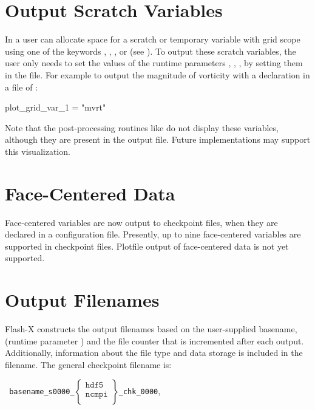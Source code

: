 \section{Output Scratch Variables}
\label{lbl:OutputScratchVariables}
In \flashx a user can allocate space for a scratch or temporary
variable with grid scope using one of the
 keywords , ,
, or
 (see ). 
To output these scratch variables, the user
only needs to set the values of the runtime parameters
,
, \etc, by
setting them in the  file.
For example to output the magnitude of vorticity
with a declaration in a  file of :
\begin{codeseg}
plot_grid_var_1 = "mvrt"
\end{codeseg}
Note that the post-processing routines like  do not display these variables,
although they are present in the output file.  Future implementations may support this visualization.

\section{Face-Centered Data}
Face-centered variables are now output to checkpoint files, when they are declared in a configuration file.  Presently, up to nine face-centered variables are supported in checkpoint files.  Plotfile output of face-centered data is not yet supported.

\section{Output Filenames}
\label{Sec:Output file names}


Flash-X constructs the output filenames%
based on the user-supplied basename, (runtime parameter )
and the file counter that is incremented after each output.
Additionally, information about the file type and data storage is
included in the filename.  The general checkpoint filename is:
\medskip

\texttt{
basename\_s0000\_$\left\{\begin{array}{c}\mathtt{hdf5}\\ \mathtt{ncmpi}\\
             \end{array}\right\}$\_chk\_0000}\enskip,
\medskip

